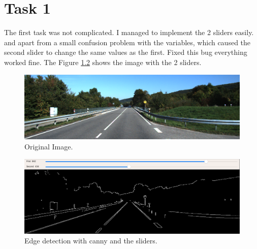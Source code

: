 
%
%         

%





\chapter{Task 1}
The first task was not complicated. I managed to implement the 2 sliders easily. and apart from a small confusion problem with the variables, which caused the second slider to change the same values as the first. Fixed this bug everything worked fine. The Figure  \ref{fig:1b} shows the image with the 2 sliders.

\begin{figure}[h]
	\centering
	\begin{minipage}{1\textwidth}
		\centering
		\includegraphics[width=\linewidth]{images/source/0}
		\caption{Original Image.}
		\label{fig:1a}
        \end{minipage}
\end{figure}

\begin{figure}[h]
	\centering
        \begin{minipage}{1\textwidth}
        		\centering
		\includegraphics[width=\linewidth]{images/source/task1/1}
		\caption{Edge detection with canny and the sliders.}
		\label{fig:1b}
        \end{minipage}
\end{figure}

